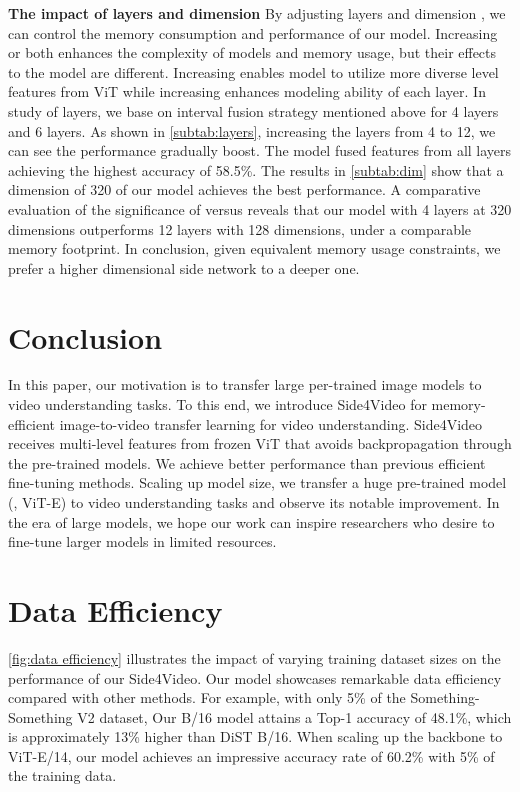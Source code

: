 \documentclass[10pt,twocolumn,letterpaper]{article}
\begin{document}
\noindent\textbf{The impact of layers and dimension} By adjusting layers  and dimension , we can control the memory consumption and performance of our model. Increasing  or  both enhances the complexity of models and memory usage, but their effects to the model are different. Increasing  enables model to utilize more diverse level features from ViT while increasing  enhances modeling ability of each layer. In study of layers, we base on interval fusion strategy mentioned above for 4 layers and 6 layers. As shown in \cref{subtab:layers}, increasing the layers from 4 to 12, we can see the performance gradually boost. The model fused features from all layers achieving the highest accuracy of 58.5\%. The results in \cref{subtab:dim} show that a dimension of 320 of our model achieves the best performance. A comparative evaluation of the significance of  versus  reveals that our model with 4 layers at 320 dimensions outperforms 12 layers with 128 dimensions, under a comparable memory footprint. In conclusion, given equivalent memory usage constraints, we prefer a higher dimensional side network to a deeper one.



%
 \section{Conclusion}
In this paper, our motivation is to transfer large per-trained image models to video understanding tasks. To this end, we introduce Side4Video for memory-efficient image-to-video transfer learning for video understanding. Side4Video receives multi-level features from frozen ViT that avoids backpropagation through the pre-trained models. We achieve better performance than previous efficient fine-tuning methods. Scaling up model size, we transfer a huge pre-trained model (\ie, ViT-E) to video understanding tasks and observe its notable improvement. In the era of large models, we hope our work can inspire researchers who desire to fine-tune larger models in limited resources. 

{
\small


}

\clearpage
\maketitlesupplementary

\appendix




\section{Data Efficiency}
\cref{fig:data efficiency} illustrates the impact of varying training dataset sizes on the performance of our Side4Video. Our model showcases remarkable data efficiency compared with other methods. For example, with only 5\% of the Something-Something V2 dataset, Our B/16 model attains a Top-1 accuracy of 48.1\%, which is approximately 13\% higher than DiST B/16. When scaling up the backbone to ViT-E/14, our model achieves an impressive accuracy rate of 60.2\% with 5\% of the training data.
\end{document}
